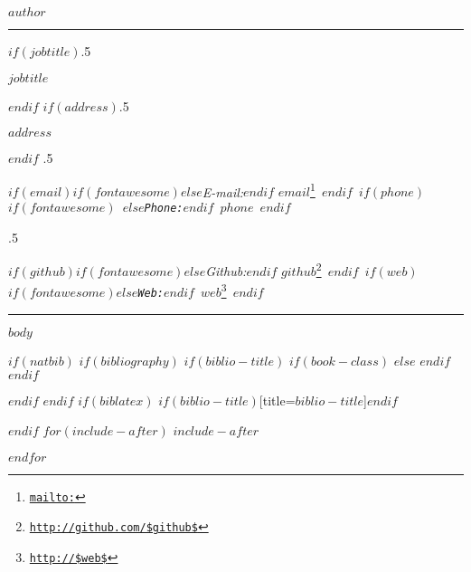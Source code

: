 \documentclass[$if(fontsize)$$fontsize$,$endif$$if(lang)$$babel-lang$,$endif$$if(papersize)$$papersize$paper,$endif$$for(classoption)$$classoption$$sep$,$endfor$]{$documentclass$}
\renewcommand{\href}[2]{#2\footnote{\url{#1}}}
\begin{document}
              
              
              \centerline{\huge \bf $author$}
              
              \vspace{2 mm}
              
              \hrule
              
              \vspace{2 mm}
              
              $if(jobtitle)$\moveleft.5\hoffset\centerline{$jobtitle$}$endif$
                $if(address)$\moveleft.5\hoffset\centerline{$address$}$endif$
                \moveleft.5\hoffset\centerline{ 
                $if(email)$$if(fontawesome)$\faEnvelopeO \hspace{1 mm}$else$\emph{E-mail:}$endif$ \href{mailto:}{\tt $email$} \hspace{1 mm}$endif$ 
                $if(phone)$$if(fontawesome)$ \faPhone \hspace{1 mm}$else$\emph{Phone:}$endif$  $phone$  \hspace{1 mm} $endif$}
                \moveleft.5\hoffset\centerline{ 
                $if(github)$$if(fontawesome)$\faGithub \hspace{1 mm}$else$\emph{Github:}$endif$ \href{http://github.com/$github$}{\tt $github$} \hspace{1 mm} $endif$   
                $if(web)$$if(fontawesome)$\faGlobe \hspace{1 mm}$else$\emph{Web:}$endif$ \href{http://$web$}{\tt $web$}  $endif$ 
                }
              
              \vspace{2 mm}
              
              \hrule
              
              
              $body$
                
                $if(natbib)$
                $if(bibliography)$
                $if(biblio-title)$
                $if(book-class)$
                \renewcommand\bibname{$biblio-title$}
              $else$
                \renewcommand\refname{$biblio-title$}
              $endif$
                $endif$
                
              
              $endif$
                $endif$
                $if(biblatex)$
                \printbibliography$if(biblio-title)$[title=$biblio-title$]$endif$
                
                $endif$
                $for(include-after)$
                $include-after$
                
                $endfor$
                
\end{document}
